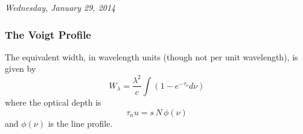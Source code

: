 \documentclass[10pt]{article}
\numberwithin{equation}{section}
\newcommand{\n}{\noindent}
\begin{document}
\n \textit{Wednesday, January 29, 2014}

\subsubsection{The Voigt Profile} %
\label{ssub:the_voigt_profile}
The equivalent width, in wavelength units (though not per unit wavelength), is
given by
\begin{equation}
  \label{eq:ew:1} W_\lambda = \frac{\lambda^2}{c} \int (1-e^{-\tau_\nu}d\nu)
\end{equation}
where the optical depth is
\begin{equation}
  \label{eq:ew:2} \tau_nu = s\,N\,\phi(\nu)
\end{equation}
and $\phi(\nu)$ is the line profile.\\
\end{document}
